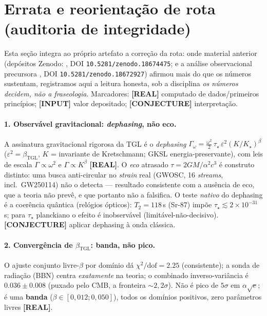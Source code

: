 \documentclass[12pt,a4paper]{article}
\newcommand{\betatgl}{\beta_{\text{TGL}}}
\newcommand{\TGL}{\textsc{TGL}}
\begin{document}
\section{Errata e reorientação de rota (auditoria de integridade)}
\label{sec:errata}
Esta seção integra ao próprio artefato a correção da rota: onde material anterior (depósitos Zenodo: \cite{MiguelTGLZenodo}, DOI \texttt{10.5281/zenodo.18674475}; e a análise observacional precursora \cite{MiguelAcoplamento2026}, DOI \texttt{10.5281/zenodo.18672927}) afirmou mais do que os números sustentam, registramos aqui a leitura honesta, sob a disciplina \emph{os números decidem, não a fraseologia}.  Marcadores: \textbf{[REAL]} computado de dados/primeiros princípios; \textbf{[INPUT]} valor depositado; \textbf{[CONJECTURE]} interpretação.

\paragraph{1. Observável gravitacional: \emph{dephasing}, não eco.} A assinatura gravitacional rigorosa da \TGL{} é o \emph{dephasing} $\Gamma_\omega=\tfrac{\omega^2}{2}\,\tau_\star\,\varepsilon^2(K/K_\star)^{\beta}$ ($\varepsilon^2=\betatgl$, $K$ = invariante de Kretschmann; GKSL energia-preservante), com leis de escala $\Gamma\propto\omega^2$ e $\Gamma\propto K^{\beta}$ \textbf{[REAL]}.  O \emph{eco} atrasado $\tau=2GM/\alpha^2c^3$ é construto distinto: uma busca anti-circular no \emph{strain} real (GWOSC, 16 \emph{streams}, incl.\ GW250114) não o detecta --- resultado consistente com a ausência de eco, que a teoria não prevê, e que portanto não a falsifica.  O teste \emph{nativo} do dephasing é a coerência quântica (relógios ópticos): $T_2=118$\,s (Sr-87) impõe $\tau_\star\lesssim 2\times10^{-31}$\,s; para $\tau_\star$ planckiano o efeito é inobservável (limitável-não-decisivo). \textbf{[CONJECTURE]} aplicar dephasing à onda clássica.

\paragraph{2. Convergência de $\betatgl$: banda, não pico.} O ajuste conjunto livre-$\beta$ por domínio dá $\chi^2/\mathrm{dof}=2.25$ (consistente); a sonda de radiação (BBN) centra \emph{exatamente} na teoria; o combinado inverso-variância é $0.036\pm0.008$ (puxado pelo CMB, a fronteira $\sim\!2{,}2\sigma$).  Não é pico de $5\sigma$ em $\alpha\sqrt{e}$; é uma \textbf{banda} ($\beta\in[0{,}012;0{,}050]$), todos os domínios positivos, zero parâmetros livres \textbf{[REAL]}.
\end{document}
